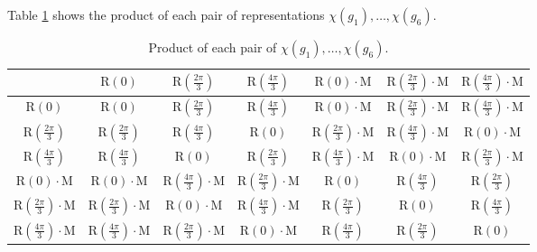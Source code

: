 \documentclass[12pt]{extarticle}
\begin{document}
Table \ref{tab:representationproducts} shows the product of each pair of representations $\chi(g_1), \ldots, \chi(g_6)$.
\begin{table}[h!]
    \centering
\begin{footnotesize}
    \begin{tabular}{c|c|c|c|c|c|c}
        & $\text{R}(0)$ & $\text{R}\left(\frac{2\pi}{3}\right)$ & $\text{R}\left(\frac{4\pi}{3}\right)$ & $\text{R}\left(0\right)\cdot\text{M}$ & $\text{R}\left(\frac{2\pi}{3}\right)\cdot\text{M}$ & $\text{R}\left(\frac{4\pi}{3}\right)\cdot\text{M}$ \\
        \hline
        $\text{R}\left(0\right)$                           & $\text{R}\left(0\right)$ & $\text{R}\left(\frac{2\pi}{3}\right)$ & $\text{R}\left(\frac{4\pi}{3}\right)$ & $\text{R}\left(0\right)\cdot\text{M}$ & $\text{R}\left(\frac{2\pi}{3}\right)\cdot\text{M}$ & $\text{R}\left(\frac{4\pi}{3}\right)\cdot\text{M}$ \\
        $\text{R}\left(\frac{2\pi}{3}\right)$              & $\text{R}\left(\frac{2\pi}{3}\right)$ & $\text{R}\left(\frac{4\pi}{3}\right)$ & $\text{R}\left(0\right)$ & $\text{R}\left(\frac{2\pi}{3}\right)\cdot\text{M}$ & $\text{R}\left(\frac{4\pi}{3}\right)\cdot\text{M}$ & $\text{R}\left(0\right)\cdot\text{M}$ \\
        $\text{R}\left(\frac{4\pi}{3}\right)$              & $\text{R}\left(\frac{4\pi}{3}\right)$ & $\text{R}\left(0\right)$ & $\text{R}\left(\frac{2\pi}{3}\right)$ & $\text{R}\left(\frac{4\pi}{3}\right)\cdot\text{M}$ & $\text{R}\left(0\right)\cdot\text{M}$ & $\text{R}\left(\frac{2\pi}{3}\right)\cdot\text{M}$ \\
        $\text{R}\left(0\right)             \cdot\text{M}$ & $\text{R}\left(0\right)\cdot\text{M}$ & $\text{R}\left(\frac{4\pi}{3}\right)\cdot\text{M}$ & $\text{R}\left(\frac{2\pi}{3}\right)\cdot\text{M}$ & $\text{R}(0)$ & $\text{R}\left(\frac{4\pi}{3}\right)$ & $\text{R}\left(\frac{2\pi}{3}\right)$ \\
        $\text{R}\left(\frac{2\pi}{3}\right)\cdot\text{M}$ & $\text{R}\left(\frac{2\pi}{3}\right)\cdot\text{M}$ & $\text{R}\left(0\right)\cdot\text{M}$ & $\text{R}\left(\frac{4\pi}{3}\right)\cdot\text{M}$ & $\text{R}\left(\frac{2\pi}{3}\right)$ & $\text{R}\left(0\right)$ & $\text{R}\left(\frac{4\pi}{3}\right)$ \\
        $\text{R}\left(\frac{4\pi}{3}\right)\cdot\text{M}$ & $\text{R}\left(\frac{4\pi}{3}\right)\cdot\text{M}$ & $\text{R}\left(\frac{2\pi}{3}\right)\cdot\text{M}$ & $\text{R}\left(0\right)\cdot\text{M}$ & $\text{R}\left(\frac{4\pi}{3}\right)$ & $\text{R}\left(\frac{2\pi}{3}\right)$ & $\text{R}\left(0\right)$ \\
    \end{tabular}
\end{footnotesize}
\caption{Product of each pair of $\chi(g_1), \ldots, \chi(g_6)$.}
\label{tab:representationproducts}
\end{table}
\end{document}
